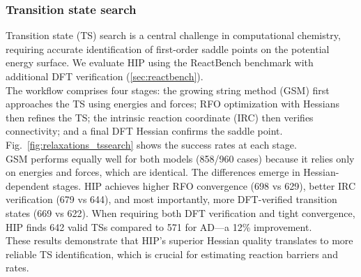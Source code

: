 \documentclass[pdflatex,sn-mathphys-num]{sn-jnl}%
\theoremstyle{thmstyleone}%
\theoremstyle{thmstyletwo}%
\theoremstyle{thmstylethree}%
\begin{document}
\subsubsection{Transition state search}

Transition state (TS) search is a central challenge in computational chemistry, requiring accurate identification of first-order saddle points on the potential energy surface. We evaluate HIP using the ReactBench benchmark \cite{zhao2025} with additional DFT verification (\ref{sec:reactbench}).\\
The workflow comprises four stages: the growing string method (GSM) first approaches the TS using energies and forces; RFO optimization with Hessians then refines the TS; the intrinsic reaction coordinate (IRC) then verifies connectivity; and a final DFT Hessian confirms the saddle point.
Fig.~\ref{fig:relaxations_tssearch} shows the success rates at each stage.\\
GSM performs equally well for both models (858/960 cases) because it relies only on energies and forces, which are identical. The differences emerge in Hessian-dependent stages. HIP achieves higher RFO convergence (698 vs 629), better IRC verification (679 vs 644), and most importantly, more DFT-verified transition states (669 vs 622). When requiring both DFT verification and tight convergence, HIP finds 642 valid TSs compared to 571 for AD—a 12\% improvement.\\
These results demonstrate that HIP's superior Hessian quality translates to more reliable TS identification, which is crucial for estimating reaction barriers and rates.

\end{document}
